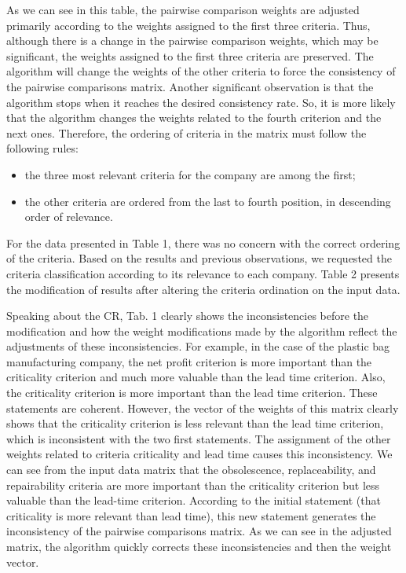 \documentclass[10pt,fleqn,a4paper,twoside]{article}
\begin{document}
As we can see in this table, the pairwise comparison weights are adjusted primarily according to the weights assigned to the first three criteria. Thus, although there is a change in the pairwise comparison weights, which may be significant, the weights assigned to the first three criteria are preserved. The algorithm will change the weights of the other criteria to force the consistency of the pairwise comparisons matrix. Another significant observation is that the algorithm stops when it reaches the desired consistency rate. So, it is more likely that the algorithm changes the weights related to the fourth criterion and the next ones. Therefore, the ordering of criteria in the matrix must follow the following rules:

\begin{itemize}
\item the three most relevant criteria for the company are among the first;
\item the other criteria are ordered from the last to fourth position, in descending order of relevance.
\end{itemize}

For the data presented in Table 1, there was no concern with the correct ordering of the criteria. Based on the results and previous observations,  we requested the criteria classification according to its relevance to each company. Table 2 presents the modification of results after altering the criteria ordination on the input data.

Speaking about the CR, Tab. 1 clearly shows the inconsistencies before the modification and how the weight modifications made by the algorithm reflect the adjustments
of these inconsistencies. For example, in the case of the plastic bag manufacturing company, the net profit criterion is more important than the criticality criterion and much more valuable than the lead time criterion. Also, the criticality criterion is more important than the lead time criterion. These statements are coherent. However, the vector of the weights of this matrix clearly shows that the criticality criterion is less relevant than the lead time criterion, which is inconsistent with the two first statements. The assignment of the other weights related to criteria criticality and lead time causes this inconsistency. We can see from the input data matrix that the obsolescence, replaceability, and repairability criteria are more important than the criticality criterion but less valuable than the lead-time criterion. According to the initial statement (that criticality is more relevant than lead time), this new statement generates the inconsistency of the pairwise comparisons matrix. As we can see in the adjusted matrix, the algorithm quickly corrects these inconsistencies and then the weight vector.
\end{document}
